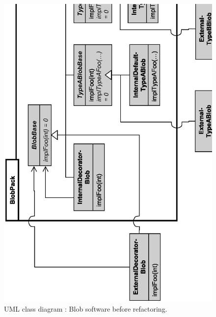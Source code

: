 \documentclass[pdf,ps2pdf,11pt]{SANDreport}
\begin{document}
{\bsinglespace
\begin{figure}[p]
\begin{center}
\includegraphics*[scale=0.75
]{BlobBaseBeforeRefactoring}
\end{center}
\caption{
\label{fig:BlobBaseBeforeRefactoring}
UML class diagram : Blob software before refactoring.  }
\end{figure}
\esinglespace}
\end{document}
